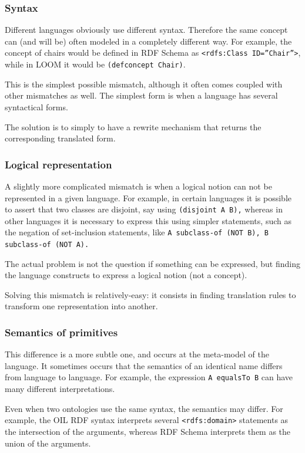 \documentclass{fast_latex}
\begin{document}
\subsubsection{Syntax}
Different languages obviously use different syntax. Therefore the same
concept can (and will be) often modeled in a completely different way.
For example, the concept of chairs would be defined in RDF Schema as
\texttt{{\textless}rdfs:Class
ID={\textquotedblright}Chair{\textquotedblright}{\textgreater}}, while
in LOOM it would be \texttt{(defconcept Chair)}. 

This is the simplest possible mismatch, although it often comes coupled
with other mismatches as well. The simplest form is when a language has
several syntactical forms. 

The solution is to simply to have a rewrite mechanism that returns the
corresponding translated form. 

\subsubsection{Logical representation}
A slightly more complicated mismatch is when a logical notion can not be
represented in a given language. For example, in certain languages it
is possible to assert that two classes are disjoint, say using
\texttt{(disjoint A B),} whereas in other languages it is
necessary to express this using simpler statements, such as the
negation of set-inclusion statements, like \texttt{A
subclass-of (NOT B), B subclass-of (NOT A).} 

The actual problem is not the question if something can be expressed,
but finding the language constructs to express a logical notion (not a
concept). 

Solving this mismatch is relatively-easy: it consists in finding
translation rules to transform one representation into another. 

\subsubsection{Semantics of primitives}
This difference is a more subtle one, and occurs at the meta-model of
the language. It sometimes occurs that the semantics of an identical
name differs from language to language. For example, the expression
\texttt{A equalsTo B} can have many different
interpretations. 

Even when two ontologies use the same syntax, the semantics may differ.
For example, the OIL RDF syntax interprets several
\texttt{{\textless}rdfs:domain{\textgreater}} statements
as the intersection of the arguments, whereas RDF Schema interprets
them as the union of the arguments. 
\end{document}
